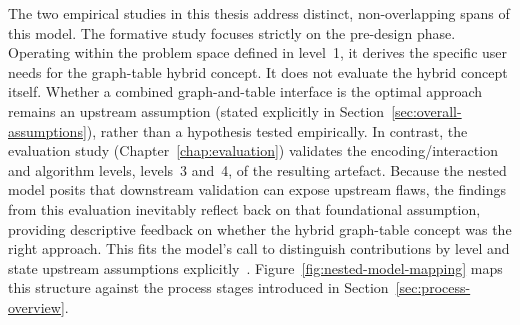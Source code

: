 The two empirical studies in this thesis address distinct, non-overlapping spans of this model. The formative study focuses strictly on the pre-design phase. Operating within the problem space defined in level~1, it derives the specific user needs for the graph-table hybrid concept. It does not evaluate the hybrid concept itself. Whether a combined graph-and-table interface is the optimal approach remains an upstream assumption (stated explicitly in Section~\ref{sec:overall-assumptions}), rather than a hypothesis tested empirically. In contrast, the evaluation study (Chapter~\ref{chap:evaluation}) validates the encoding/interaction and algorithm levels, levels~3 and~4, of the resulting artefact. Because the nested model posits that downstream validation can expose upstream flaws, the findings from this evaluation inevitably reflect back on that foundational assumption, providing descriptive feedback on whether the hybrid graph-table concept was the right approach. This fits the model's call to distinguish contributions by level and state upstream assumptions explicitly~\cite{munzner2009}. Figure~\ref{fig:nested-model-mapping} maps this structure against the process stages introduced in Section~\ref{sec:process-overview}.

